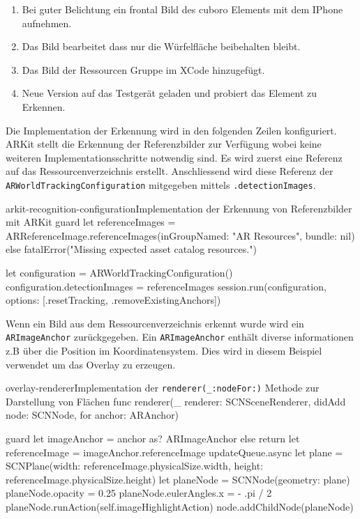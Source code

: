 \begin{description}
	\begin{enumerate}
		\item Bei guter Belichtung ein frontal Bild des cuboro Elements mit dem IPhone aufnehmen. 
		\item Das Bild bearbeitet dass nur die Würfelfläche beibehalten bleibt.
		\item Das Bild der Ressourcen Gruppe im XCode hinzugefügt.
		\item Neue Version auf das Testgerät geladen und probiert das Element zu Erkennen.  
	\end{enumerate}



	Die Implementation der Erkennung wird in den folgenden Zeilen konfiguriert. ARKit stellt die Erkennung der Referenzbilder zur Verfügung wobei keine weiteren Implementationsschritte notwendig sind. Es wird zuerst eine Referenz auf das Ressourcenverzeichnis erstellt. Anschliessend wird diese Referenz der \texttt{ARWorldTrackingConfiguration} mitgegeben mittels \texttt{.detectionImages}.
	\begin{code}{arkit-recognition-configuration}{Implementation der Erkennung von Referenzbilder mit ARKit}
	guard let referenceImages = ARReferenceImage.referenceImages(inGroupNamed: "AR Resources", bundle: nil) else {
		fatalError("Missing expected asset catalog resources.")
	}
	
	let configuration = ARWorldTrackingConfiguration()
	configuration.detectionImages = referenceImages
	session.run(configuration, options: [.resetTracking, .removeExistingAnchors])
	\end{code}

	Wenn ein Bild aus dem Ressourcenverzeichnis erkennt wurde wird ein \texttt{ARImageAnchor} zurückgegeben. Ein \texttt{ARImageAnchor} enthält diverse informationen z.B über die Position im Koordinatensystem. Dies wird in diesem Beispiel verwendet um das Overlay zu erzeugen. 

	\begin{code}{overlay-renderer}{Implementation der \texttt{renderer(\_:nodeFor:)} Methode zur Darstellung von Flächen}
		func renderer(_ renderer: SCNSceneRenderer, didAdd node: SCNNode, for anchor: ARAnchor) {
			guard let imageAnchor = anchor as? ARImageAnchor else { return }
			let referenceImage = imageAnchor.referenceImage
			updateQueue.async {
				let plane = SCNPlane(width: referenceImage.physicalSize.width,
									height: referenceImage.physicalSize.height)
				let planeNode = SCNNode(geometry: plane)
				planeNode.opacity = 0.25
				planeNode.eulerAngles.x =  - .pi / 2
				planeNode.runAction(self.imageHighlightAction)
				node.addChildNode(planeNode)
			}

}
\end{code}
\end{description}
